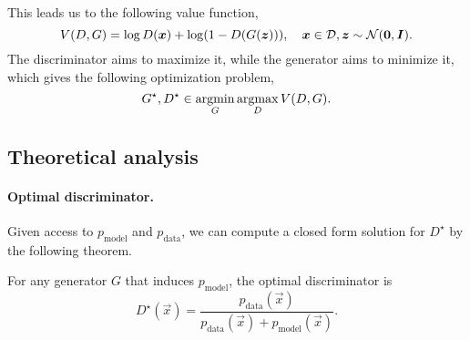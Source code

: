 This leads us to the following value function, \[
    V(D,G) = \log D(\bm{x}) + \log (1 - D(G(\bm{z}))), \quad \bm{x} \in \mathcal{D}, \bm{z} \sim \mathcal{N}(\bm{0}, \bm{I}).
\]
The discriminator aims to maximize it, while the generator aims to minimize it, which gives the
following optimization problem, \[
    G^\star, D^\star \in \operatorname*{argmin}_G \operatorname*{argmax}_D V(D,G).
\]

\subsection{Theoretical analysis}

\paragraph{Optimal discriminator.}

Given access to $p_{\mathrm{model}}$ and $p_{\mathrm{data}}$, we can compute a closed form solution
for $D^\star$ by the following theorem.

\begin{theorem}
    For any generator $G$ that induces $p_{\mathrm{model}}$, the optimal discriminator is \[
        D^\star(\vec{x}) = \frac{p_{\mathrm{data}}(\vec{x})}{p_{\mathrm{data}}(\vec{x}) + p_{\mathrm{model}}(\vec{x})}.
    \]
\end{theorem}

